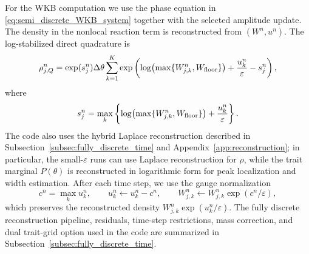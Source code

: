 \documentclass[11pt]{article}
\begin{document}
For the WKB computation we use the phase equation in \eqref{eq:semi_discrete_WKB_system} together with the selected amplitude update.  The density in the nonlocal reaction term is reconstructed from \((W^n,u^n)\).  The log-stabilized direct quadrature is
\begin{equation}\label{eq:log_stable_rho_new}
    \rho_{j,Q}^n
    =\exp(s_j^n)\Delta\theta
    \sum_{k=1}^{K} \exp\left(
    \log\bigl(\max\{W_{j,k}^n,W_{\rm floor}\}\bigr)
    +\frac{u_k^n}{\varepsilon}-s_j^n\right),
\end{equation}
where
\[
    s_j^n=\max_k\left
    \{\log\bigl(\max\{W_{j,k}^n,W_{\rm floor}\}\bigr)
    +\frac{u_k^n}{\varepsilon}\right\}.
\]
The code also uses the hybrid Laplace reconstruction described in
Subsection~\ref{subsec:fully_discrete_time} and Appendix~\ref{app:reconstruction}; in particular, the small-\(\varepsilon\) runs can use Laplace reconstruction for \(\rho\), while the trait marginal \(P(\theta)\) is reconstructed in logarithmic form for peak localization and width estimation.  After each time step, we use the gauge normalization
\begin{equation}\label{eq:gauge_new}
    c^n=\max_k u_k^n,
    \qquad
    u_k^n\leftarrow u_k^n-c^n,
    \qquad
    W_{j,k}^n\leftarrow W_{j,k}^n\exp(c^n/\varepsilon),
\end{equation}
which preserves the reconstructed density \(W_{j,k}^n\exp(u_k^n/\varepsilon)\). {\color{red} The fully discrete reconstruction pipeline, residuals, time-step restrictions, mass correction, and dual trait-grid option used in the code are summarized in Subsection~\ref{subsec:fully_discrete_time}.}
\end{document}
